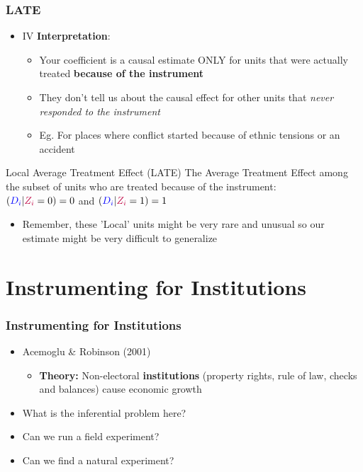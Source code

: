 \documentclass[xcolor=x11names,compress]{beamer}\usepackage[]{graphicx}\usepackage[]{color}
\renewcommand{\(}{\begin{columns}}
\renewcommand{\)}{\end{columns}}
\newcommand{\<}[1]{\begin{column}{#1}}
\renewcommand{\>}{\end{column}}
\begin{document}
\begin{frame}
\frametitle{LATE}
\begin{itemize}
\item IV \textbf{Interpretation}:
\pause
\begin{itemize}
\item Your coefficient is a causal estimate ONLY for units that were actually treated \textbf{because of the instrument}
\pause
\item They don't tell us about the causal effect for other units that \textit{never responded to the instrument}
\pause
\item Eg. For places where conflict started because of ethnic tensions or an accident
\end{itemize}
\end{itemize}
\pause
\begin{block}{Local Average Treatment Effect (LATE)}
The Average Treatment Effect among the subset of units who are treated because of the instrument: \\
$(\textcolor{blue}{D_i}|\textcolor{purple}{Z_i}=0) = 0$ and $(\textcolor{blue}{D_i}|\textcolor{purple}{Z_i}=1) = 1$
\end{block}
\begin{itemize}
\pause
\item Remember, these 'Local' units might be very rare and unusual so our estimate might be very difficult to generalize
\end{itemize}
\end{frame}

\section{Instrumenting for Institutions}

\begin{frame}
\frametitle{Instrumenting for Institutions}
\begin{itemize}
\item Acemoglu \& Robinson (2001)
\begin{itemize}
\item \textbf{Theory:} Non-electoral \textbf{institutions} (property rights, rule of law, checks and balances) cause economic growth
\pause
\end{itemize}
\item What is the inferential problem here?
\pause
\item Can we run a field experiment?
\pause
\item Can we find a natural experiment?
\end{itemize}
\end{frame}
\end{document}
